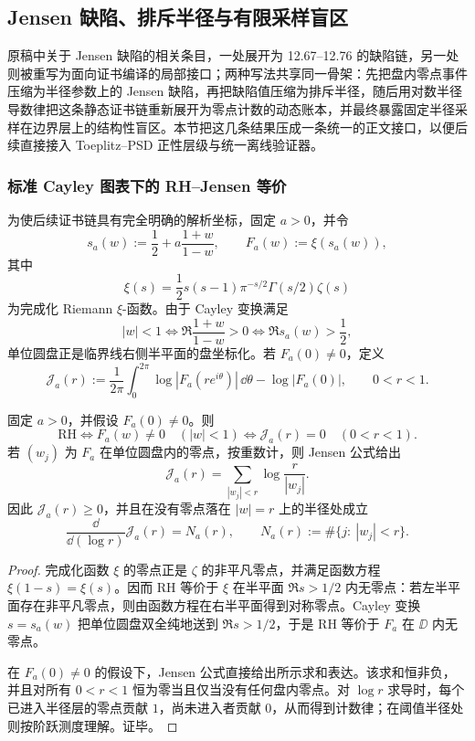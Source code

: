 \subsection{Jensen 缺陷、排斥半径与有限采样盲区}\label{subsec:typed-address-biaxial-completion-jensen-defect-repulsion-blindspot}
原稿中关于 Jensen 缺陷的相关条目，一处展开为 12.67--12.76 的缺陷链，另一处则被重写为面向证书编译的局部接口；两种写法共享同一骨架：先把盘内零点事件压缩为半径参数上的 Jensen 缺陷，再把缺陷值压缩为排斥半径，随后用对数半径导数律把这条静态证书链重新展开为零点计数的动态账本，并最终暴露固定半径采样在边界层上的结构性盲区。本节把这几条结果压成一条统一的正文接口，以便后续直接接入 Toeplitz--PSD 正性层级与统一离线验证器。

\subsubsection{标准 Cayley 图表下的 RH--Jensen 等价}\label{subsubsec:typed-address-biaxial-completion-cayley-jensen-standard-chart}
为使后续证书链具有完全明确的解析坐标，固定 \(a>0\)，并令
\[
s_a(w):=\frac12+a\frac{1+w}{1-w},
\qquad
F_a(w):=\xi(s_a(w)),
\]
其中
\[
\xi(s)=\frac12s(s-1)\pi^{-s/2}\Gamma(s/2)\zeta(s)
\]
为完成化 Riemann \(\xi\)-函数。由于 Cayley 变换满足
\[
|w|<1
\iff
\Re\frac{1+w}{1-w}>0
\iff
\Re s_a(w)>\frac12,
\]
单位圆盘正是临界线右侧半平面的盘坐标化。若 \(F_a(0)\ne0\)，定义
\[
\mathcal J_a(r)
:=
\frac1{2\pi}\int_0^{2\pi}\log |F_a(re^{i\theta})|\,\dd\theta
-\log |F_a(0)|,
\qquad 0<r<1.
\]

\begin{theorem}\label{thm:typed-address-biaxial-completion-cayley-jensen-gap-equivalence}
固定 \(a>0\)，并假设 \(F_a(0)\ne0\)。则
\[
\mathrm{RH}
\iff
F_a(w)\ne0\quad(|w|<1)
\iff
\mathcal J_a(r)=0\quad(0<r<1).
\]
若 \((w_j)\) 为 \(F_a\) 在单位圆盘内的零点，按重数计，则 Jensen 公式给出
\[
\mathcal J_a(r)
=
\sum_{|w_j|<r}\log\frac{r}{|w_j|}.
\]
因此 \(\mathcal J_a(r)\ge0\)，并且在没有零点落在 \(|w|=r\) 上的半径处成立
\[
\frac{\dd}{\dd(\log r)}\mathcal J_a(r)
=
N_a(r),
\qquad
N_a(r):=\#\{j:\ |w_j|<r\}.
\]
\end{theorem}
\begin{proof}
完成化函数 \(\xi\) 的零点正是 \(\zeta\) 的非平凡零点，并满足函数方程 \(\xi(1-s)=\xi(s)\)。因而 RH 等价于 \(\xi\) 在半平面 \(\Re s>1/2\) 内无零点：若左半平面存在非平凡零点，则由函数方程在右半平面得到对称零点。Cayley 变换 \(s=s_a(w)\) 把单位圆盘双全纯地送到 \(\Re s>1/2\)，于是 RH 等价于 \(F_a\) 在 \(\DD\) 内无零点。

在 \(F_a(0)\ne0\) 的假设下，Jensen 公式直接给出所示求和表达。该求和恒非负，并且对所有 \(0<r<1\) 恒为零当且仅当没有任何盘内零点。对 \(\log r\) 求导时，每个已进入半径层的零点贡献 \(1\)，尚未进入者贡献 \(0\)，从而得到计数律；在阈值半径处则按阶跃测度理解。证毕。
\end{proof}

